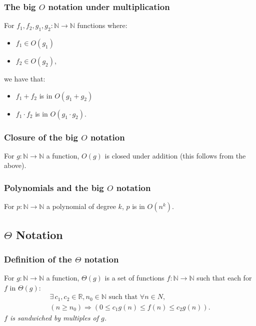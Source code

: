 \documentclass[a4paper, 12pt, twoside]{article}
\begin{document}
\subsubsection{The big $O$ notation under multiplication}

For $f_1, f_2, g_1, g_2 : \mathbb{N} \to \mathbb{N}$ functions where:
\begin{itemize}
      \item $f_1 \in O(g_1)$
      \item $f_2 \in O(g_2)$,
\end{itemize}
we have that:
\begin{itemize}
      \item $f_1 + f_2$ is in $O(g_1 + g_2)$
      \item $f_1 \cdot f_2$ is in $O(g_1 \cdot g_2)$.
\end{itemize}

\subsubsection{Closure of the big $O$ notation}

For $g : \mathbb{N} \to \mathbb{N}$ a function, $O(g)$ is closed
under addition (this follows from the above).

\subsubsection{Polynomials and the big $O$ notation}

For $p : \mathbb{N} \to \mathbb{N}$ a polynomial of degree $k$,
$p$ is in $O(n^k)$.

\subsection{$\Theta$ Notation}

\subsubsection{Definition of the $\Theta$ notation}

For $g : \mathbb{N} \to \mathbb{N}$ a function, $\Theta(g)$ is a set of
functions $f : \mathbb{N} \to \mathbb{N}$ such that each for
$f$ in $\Theta(g)$:
\begin{gather*}
      \exists \, c_1, c_2 \in \mathbb{R}, n_0 \in \mathbb{N}
      \text{ such that } \forall n \in N, \\
      (n \geq n_0) \Rightarrow (0 \leq c_1g(n) \leq f(n) \leq c_2g(n)).
\end{gather*}
\textit{$f$ is sandwiched by multiples of $g$.}
\end{document}
